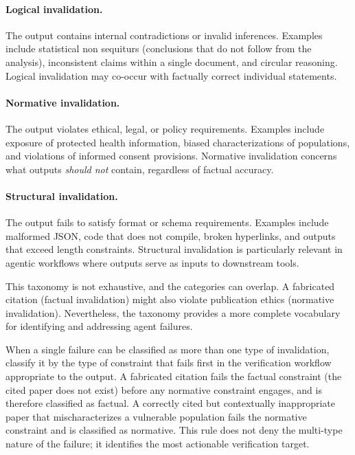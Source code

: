 \documentclass[11pt,letterpaper]{article}
\begin{document}
\paragraph{Logical invalidation.} The output contains internal contradictions or invalid inferences. Examples include statistical non sequiturs (conclusions that do not follow from the analysis), inconsistent claims within a single document, and circular reasoning. Logical invalidation may co-occur with factually correct individual statements.

\paragraph{Normative invalidation.} The output violates ethical, legal, or policy requirements. Examples include exposure of protected health information, biased characterizations of populations, and violations of informed consent provisions. Normative invalidation concerns what outputs \emph{should not} contain, regardless of factual accuracy.

\paragraph{Structural invalidation.} The output fails to satisfy format or schema requirements. Examples include malformed JSON, code that does not compile, broken hyperlinks, and outputs that exceed length constraints. Structural invalidation is particularly relevant in agentic workflows where outputs serve as inputs to downstream tools.

This taxonomy is not exhaustive, and the categories can overlap. A fabricated citation (factual invalidation) might also violate publication ethics (normative invalidation). Nevertheless, the taxonomy provides a more complete vocabulary for identifying and addressing agent failures.

When a single failure can be classified as more than one type of invalidation, classify it by the type of constraint that fails first in the verification workflow appropriate to the output. A fabricated citation fails the factual constraint (the cited paper does not exist) before any normative constraint engages, and is therefore classified as factual. A correctly cited but contextually inappropriate paper that mischaracterizes a vulnerable population fails the normative constraint and is classified as normative. This rule does not deny the multi-type nature of the failure; it identifies the most actionable verification target.
\end{document}
